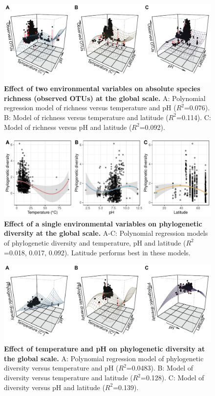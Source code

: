 \begin{figure}[H]
    \centering
    \includegraphics[scale=0.8]{./Figures/OO_PM_all_2EVs_3D}
    \caption{\textbf{Effect of two environmental variables on absolute species richness (observed OTUs) at the global scale.} A: Polynomial regression model of richness versus temperature and pH ($R^{2}$=0.076). B: Model of richness versus temperature and latitude ($R^{2}$=0.114). C: Model of richness versus pH and latitude ($R^{2}$=0.092).}
    \label{fig:OO_PM_2EVs}
\end{figure}

\begin{figure}[H]
    \centering
    \includegraphics[scale=0.8]{./Figures/PD_PM_simpleTpL}
    \caption{\textbf{Effect of a single environmental variables on phylogenetic diversity at the global scale.} A-C: Polynomial regression models of phylogenetic diversity and temperature, pH and latitude ($R^{2}$=0.018, 0.017, 0.092). Latitude performs best in these models. }
    \label{fig:PD_PM_simpleTpL}
\end{figure}

\begin{figure}[H]
    \centering
    \includegraphics[scale=0.8]{./Figures/PD_PM_all_2EVs_3D}
    \caption{\textbf{Effect of temperature and pH on phylogenetic diversity at the global scale.} A: Polynomial regression model of phylogenetic diversity versus temperature and pH ($R^{2}$=0.0483). B: Model of diversity versus temperature and latitude ($R^{2}$=0.128). C: Model of diversity versus pH and latitude ($R^{2}$=0.139).}
    \label{fig:PD_PM_2EVs}
\end{figure}

